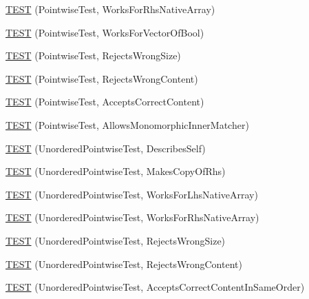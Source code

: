 \begin{DoxyCompactItemize}
\mbox{\hyperlink{namespacetesting_1_1gmock__matchers__test_adabf6a3ceda0024d630d2ece31e37f7c}{T\+E\+ST}} (Pointwise\+Test, Works\+For\+Rhs\+Native\+Array)
\item 
\mbox{\hyperlink{namespacetesting_1_1gmock__matchers__test_a9c640ab477c872e25de719b6ed980d7c}{T\+E\+ST}} (Pointwise\+Test, Works\+For\+Vector\+Of\+Bool)
\item 
\mbox{\hyperlink{namespacetesting_1_1gmock__matchers__test_a1f73a8fa9dd9560bd606a990444a81fe}{T\+E\+ST}} (Pointwise\+Test, Rejects\+Wrong\+Size)
\item 
\mbox{\hyperlink{namespacetesting_1_1gmock__matchers__test_a135ad7162da91c9a234193fbbe5ef775}{T\+E\+ST}} (Pointwise\+Test, Rejects\+Wrong\+Content)
\item 
\mbox{\hyperlink{namespacetesting_1_1gmock__matchers__test_a42b98b370f1897cecfafbbfba53f4f38}{T\+E\+ST}} (Pointwise\+Test, Accepts\+Correct\+Content)
\item 
\mbox{\hyperlink{namespacetesting_1_1gmock__matchers__test_a9bbef6d651166c37af32c54923bcd849}{T\+E\+ST}} (Pointwise\+Test, Allows\+Monomorphic\+Inner\+Matcher)
\item 
\mbox{\hyperlink{namespacetesting_1_1gmock__matchers__test_af3307f88a321331155a146d49974e3e3}{T\+E\+ST}} (Unordered\+Pointwise\+Test, Describes\+Self)
\item 
\mbox{\hyperlink{namespacetesting_1_1gmock__matchers__test_a05e9bbee9d19692f45a846c2ff45e016}{T\+E\+ST}} (Unordered\+Pointwise\+Test, Makes\+Copy\+Of\+Rhs)
\item 
\mbox{\hyperlink{namespacetesting_1_1gmock__matchers__test_a57e330a5ae600f65d4daa2ed57bbc887}{T\+E\+ST}} (Unordered\+Pointwise\+Test, Works\+For\+Lhs\+Native\+Array)
\item 
\mbox{\hyperlink{namespacetesting_1_1gmock__matchers__test_ae75a933b86db4c43a7bec2ffa97692ef}{T\+E\+ST}} (Unordered\+Pointwise\+Test, Works\+For\+Rhs\+Native\+Array)
\item 
\mbox{\hyperlink{namespacetesting_1_1gmock__matchers__test_a50412d02c70f8303a087e6832d26ba62}{T\+E\+ST}} (Unordered\+Pointwise\+Test, Rejects\+Wrong\+Size)
\item 
\mbox{\hyperlink{namespacetesting_1_1gmock__matchers__test_a9a9a85c6598ab74463703acbd01aa1a7}{T\+E\+ST}} (Unordered\+Pointwise\+Test, Rejects\+Wrong\+Content)
\item 
\mbox{\hyperlink{namespacetesting_1_1gmock__matchers__test_aa68bf48e4a8fa41fcd60f59cc60ede8f}{T\+E\+ST}} (Unordered\+Pointwise\+Test, Accepts\+Correct\+Content\+In\+Same\+Order)

\end{DoxyCompactItemize}
